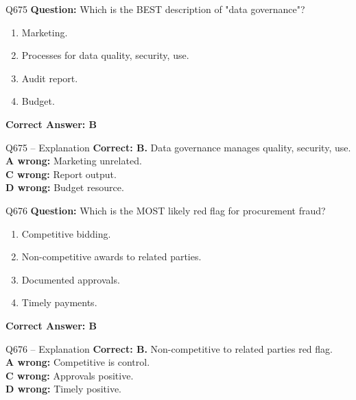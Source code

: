 \documentclass[aspectratio=169,10pt]{beamer}
\begin{document}
	\begin{frame}[t]{Q675}
		\small
		\textbf{Question:} Which is the BEST description of "data governance"?
		\begin{enumerate}[label=\Alph*.,itemsep=1pt,topsep=2pt]
			\item Marketing.
			\item Processes for data quality, security, use.
			\item Audit report.
			\item Budget.
		\end{enumerate}
		\vspace{4pt}
		\textbf{Correct Answer: B}
	\end{frame}
	
	\begin{frame}[t]{Q675 -- Explanation}
		\small
		\textbf{Correct: B.} Data governance manages quality, security, use. \\[4pt]
		\textbf{A wrong:} Marketing unrelated. \\[2pt]
		\textbf{C wrong:} Report output. \\[2pt]
		\textbf{D wrong:} Budget resource.
	\end{frame}
	
	\begin{frame}[t]{Q676}
		\small
		\textbf{Question:} Which is the MOST likely red flag for procurement fraud?
		\begin{enumerate}[label=\Alph*.,itemsep=1pt,topsep=2pt]
			\item Competitive bidding.
			\item Non-competitive awards to related parties.
			\item Documented approvals.
			\item Timely payments.
		\end{enumerate}
		\vspace{4pt}
		\textbf{Correct Answer: B}
	\end{frame}
	
	\begin{frame}[t]{Q676 -- Explanation}
		\small
		\textbf{Correct: B.} Non-competitive to related parties red flag. \\[4pt]
		\textbf{A wrong:} Competitive is control. \\[2pt]
		\textbf{C wrong:} Approvals positive. \\[2pt]
		\textbf{D wrong:} Timely positive.
	\end{frame}
	
\end{document}
